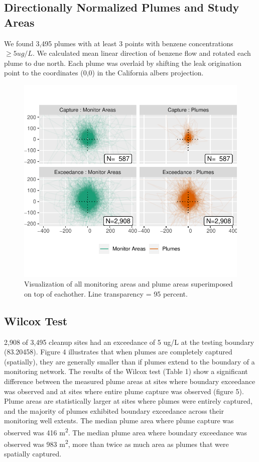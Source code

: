 \documentclass[draft,linenumbers]{agujournal2018}
\begin{document}
\subsection{Directionally Normalized Plumes and Study Areas}

We found 3,495 plumes with at least 3 points with benzene concentrations
\(\ge 5 ug/L\). We calculated mean linear direction of benzene flow and
rotated each plume to due north. Each plume was overlaid by shifting the
leak origination point to the coordinates (0,0) in the California albers
projection.

\begin{figure}[!h]

{\centering \includegraphics{CA_Benzene_Plumes_files/figure-latex/AllplumeAreas-1} 

}

\caption{Visualization of all monitoring areas and plume areas superimposed on top of eachother. Line transparency = 95 percent.}\label{fig:AllplumeAreas}
\end{figure}

\subsection{Wilcox Test}

2,908 of 3,495 cleanup sites had an exceedance of 5 ug/L at the testing
boundary (83.20458). Figure 4 illustrates that when plumes are
completely captured (spatially), they are generally smaller than if
plumes extend to the boundary of a monitoring network. The results of
the Wilcox test (Table 1) show a significant difference between the
measured plume areas at sites where boundary exceedance was observed and
at sites where entire plume capture was observed (figure 5). Plume areas
are statistically larger at sites where plumes were entirely captured,
and the majority of plumes exhibited boundary exceedance across their
monitoring well extents. The median plume area where plume capture was
observed was 416 m\textsuperscript{2}. The median plume area where
boundary exceedance was observed was 983 m\textsuperscript{2}, more than
twice as much area as plumes that were spatially captured.
\end{document}
